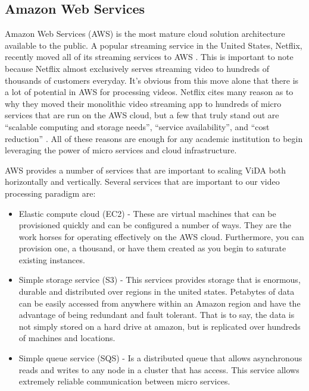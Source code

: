 \subsection{\label{subsection:aws}Amazon Web Services}
Amazon Web Services (AWS) is the most mature cloud solution architecture available
to the public. A popular streaming service in the United States, Netflix,
recently moved all of its streaming services to AWS \cite{netflixawsmove}. This is important to note
because Netflix almost exclusively serves streaming video to hundreds of thousands
of customers everyday. It's obvious from this move alone that there is a lot
of potential in AWS for processing videos. Netflix cites many reason as to why
they moved their monolithic video streaming app to hundreds of micro services
that are run on the AWS cloud, but a few that truly stand out are \enquote{scalable
computing and storage needs}, \enquote{service availability}, and \enquote{cost reduction}
\cite{netflixawsmove}. All of these reasons are enough for any academic institution
to begin leveraging the power of micro services and cloud infrastructure.

AWS provides a number of services that are important to scaling ViDA
both horizontally and vertically. Several services that are important to
our video processing paradigm are:
\begin{itemize}
\item Elastic compute cloud (EC2) - These are virtual machines that can be provisioned
quickly and can be configured a number of ways. They are the work horses for
operating effectively on the AWS cloud. Furthermore, you can provision one, a thousand,
or have them created as you begin to saturate existing instances.
\item Simple storage service (S3) - This services provides storage that is enormous,
durable and distributed over regions in the united states. Petabytes of data can
be easily accessed from anywhere within an Amazon region and have the advantage
of being redundant and fault tolerant. That is to say, the data is not simply
stored on a hard drive at amazon, but is replicated over hundreds of machines
and locations.
\item Simple queue service (SQS) - Is a distributed queue that allows asynchronous
reads and writes to any node in a cluster that has access. This service allows
extremely reliable communication between micro services. 
\end{itemize}
